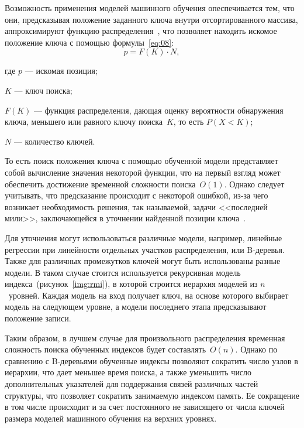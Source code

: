 
Возможность применения моделей машинного обучения опеспечивается тем, что они,
предсказывая положение заданного ключа внутри отсортированного массива,
аппроксимируют функцию распределения~\cite{main}, что позволяет находить искомое
положение ключа с помощью формулы~\eqref{eq:08}:
\begin{equation}\label{eq:08}
    p = F(K) \cdot N,
\end{equation}

где $p$ --- искомая позиция;

$K$ --- ключ поиска;

$F(K)$ --- функция распределения, дающая оценку вероятности обнаружения
ключа, меньшего или равного ключу поиска~$K$, то есть $P(X < K)$;

$N$ --- количество ключей.

То есть поиск положения ключа с помощью обученной модели представляет собой
вычисление значения некоторой функции, что на первый взгляд может обеспечить
достижение временной сложности поиска~$O(1)$. Однако следует
учитывать, что предсказание происходит с некоторой ошибкой, из-за чего возникает
необходимость решения, так называемой, задачи <<последней мили>>, заключающейся
в уточнении найденной позиции ключа~\cite{main}.

Для уточнения могут использоваться различные модели, например, линейные
регрессии при линейности отдельных участков распределения, или B-деревья. Также
для различных промежутков ключей могут быть использованы разные модели. В таком
случае стоится используется рекурсивная модель индекса~(рисунок~\ref{img:rmi}),
в которой строится иерархия моделей из $n$~уровней. Каждая модель на вход
получает ключ, на основе которого выбирает модель на следующем уровне, а модели
последнего этапа предсказывают положение записи.


Таким образом, в лучшем случае для произвольного распределения временная
сложность поиска обученных индексов будет составлять~$O(n)$.  Однако по
сравнению с B-деревьями обученные индексы позволяют сократить число узлов в
иерархии, что дает меньшее время поиска, а также уменьшить число дополнительных
указателей для поддержания связей различных частей структуры, что позволяет
сократить занимаемую индексом память. Ее сокращение в том числе происходит и за
счет постоянного не зависящего от числа ключей размера моделей машинного
обучения на верхних уровнях.

